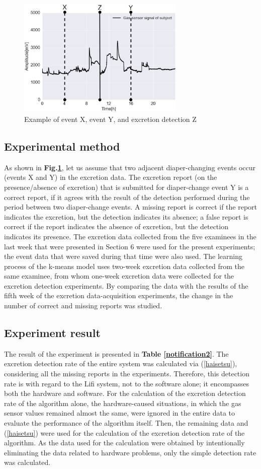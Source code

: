 \documentclass[publish,JRM,paper]{jaciiiarticle}
\begin{document}
\begin{figure}[t]
  \centering
  \includegraphics[width=8cm]{./fig/xyz.eps}
  \caption{Example of event X, event Y, and excretion detection Z}
  \label{event}
\end{figure}
\subsection{Experimental method}
As shown in {\bf Fig.\ref{event}}, let us assume that two adjacent diaper-changing events occur (events X and Y) in the excretion data. The excretion report (on the presence/absence of excretion) that is submitted for diaper-change event Y is a correct report, if it agrees with the result of the detection performed during the period between two diaper-change events. A missing report is correct if the report indicates the excretion, but the detection indicates its absence; a false report is correct if the report indicates the absence of excretion, but the detection indicates its presence. The excretion data collected from the five examinees in the last week that were presented in Section 6 were used for the present experiments; the event data that were saved during that time were also used. The learning process of the k-means model uses two-week excretion data collected from the same examinee, from whom one-week excretion data were collected for the excretion detection experiments. By comparing the data with the results of the fifth week of the excretion data-acquisition experiments, the change in the number of correct and missing reports was studied.

\subsection{Experiment result}
The result of the experiment is presented in {\bf Table \ref{notification2}}. The excretion detection rate of the entire system was calculated via (\ref{haisetsu}), considering all the missing reports in the experiments. Therefore, this detection rate is with regard to the Lifi system, not to the software alone; it encompasses both the hardware and software. For the calculation of the excretion detection rate of the algorithm alone, the hardware-caused situations, in which the gas sensor values remained almost the same, were ignored in the entire data to evaluate the performance of the algorithm itself. Then, the remaining data and (\ref{haisetsu}) were used for the calculation of the excretion detection rate of the algorithm. As the data used for the calculation were obtained by intentionally eliminating the data related to hardware problems, only the simple detection rate was calculated.
\end{document}
